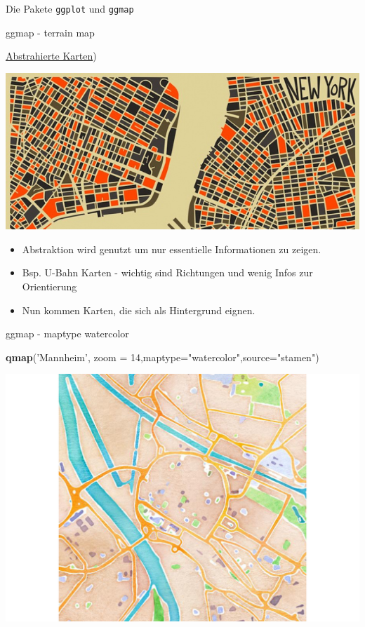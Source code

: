 \documentclass[ignorenonframetext,]{beamer}
\newenvironment{Shaded}{}{}
\newcommand{\KeywordTok}[1]{\textcolor[rgb]{0.00,0.44,0.13}{\textbf{{#1}}}}
\newcommand{\DataTypeTok}[1]{\textcolor[rgb]{0.56,0.13,0.00}{{#1}}}
\newcommand{\DecValTok}[1]{\textcolor[rgb]{0.25,0.63,0.44}{{#1}}}
\newcommand{\StringTok}[1]{\textcolor[rgb]{0.25,0.44,0.63}{{#1}}}
\newcommand{\NormalTok}[1]{{#1}}
\providecommand{\tightlist}{%
\setlength{\itemsep}{0pt}\setlength{\parskip}{0pt}}
\begin{document}
\begin{frame}[fragile]{Die Pakete \texttt{ggplot} und \texttt{ggmap}}
\begin{block}{ggmap - terrain map}
\end{block}

\begin{block}{\href{http://www.designfaves.com/2014/03/abstracted-maps-reveal-cities-personalities}{Abstrahierte
Karten})}

\includegraphics{./tex2pdf.9796/fe48d8ba47fef64a463668f151db18a4d3782b5a.jpg}

\begin{itemize}
\tightlist
\item
  Abstraktion wird genutzt um nur essentielle Informationen zu zeigen.
\item
  Bsp. U-Bahn Karten - wichtig sind Richtungen und wenig Infos zur
  Orientierung
\item
  Nun kommen Karten, die sich als Hintergrund eignen.
\end{itemize}

\end{block}

\begin{block}{ggmap - maptype watercolor}

\begin{Shaded}
\begin{Highlighting}[]
\KeywordTok{qmap}\NormalTok{(}\StringTok{'Mannheim'}\NormalTok{, }\DataTypeTok{zoom =} \DecValTok{14}\NormalTok{,}\DataTypeTok{maptype=}\StringTok{"watercolor"}\NormalTok{,}\DataTypeTok{source=}\StringTok{"stamen"}\NormalTok{)}
\end{Highlighting}
\end{Shaded}

\includegraphics{R_intern_files/figure-beamer/unnamed-chunk-266-1.pdf}


\end{block}
\end{frame}
\end{document}
